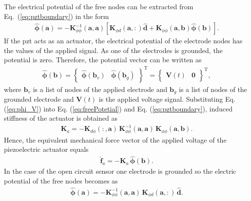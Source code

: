 \documentclass[11pt,a4paper,final]{report}
\theoremstyle{plain}
\begin{document}
The electrical potential of the free nodes can be extracted from Eq.~(\ref{eq:pztboundary}) in the form
\begin{eqnarray}
	\widehat{\boldsymbol{\phi}}(\textbf{a}) = -\textbf{K}_{\phi\phi}^{-1}(\textbf{a},\textbf{a})\left[\textbf{K}_{\phi d}(\textbf{a},:) \widehat{\textbf{d}} + \textbf{K}_{\phi\phi}(\textbf{a},\textbf{b})\widehat{\boldsymbol{\phi}}(\textbf{b}) \right].
	\label{eq:freePotetial}
\end{eqnarray}
If the \ac{pzt} acts as an actuator, the electrical potential of the electrode nodes has the values of the applied signal.
As one of the electrodes is grounded, the potential is zero.
Therefore, the potential vector can be written as
\begin{eqnarray}
	\widehat{\boldsymbol{\phi}}(\textbf{b}) = \left \{\begin{array}{cc}
		\widehat{\boldsymbol{\phi}}(\textbf{b}_v) &
		\widehat{\boldsymbol{\phi}}(\textbf{b}_g)
	\end{array}\right \}^{\mathrm{T}}=\left \{\begin{array}{cc}
	\textbf{V}(t) & \textbf{0}
	\end{array}\right \}^{\mathrm{T}},
	\label{eq:phi_V}
\end{eqnarray}
where \(\textbf{b}_v\) is a list of nodes of the applied electrode and \(\textbf{b}_g\) is a list of nodes of the grounded electrode and \(\textbf{V}(t)\) is the applied voltage signal.
Substituting Eq. (\ref{eq:phi_V}) into Eq. (\ref{eq:freePotetial}) and Eq. (\ref{eq:pztboundary}), induced stiffness of the actuator is obtained as
\begin{eqnarray}
	\textbf{K}_{a}=-\textbf{K}_{d\phi}(:,\textbf{a})\,\textbf{K}_{\phi \phi}^{-1}(\textbf{a},\textbf{a})\,\textbf{K}_{\phi \phi} (\textbf{a},\textbf{b}).
\end{eqnarray}
Hence, the equivalent mechanical force vector of the applied voltage of the piezoelectric actuator equals
\begin{eqnarray}
	\widehat{\textbf{f}}_{a}=-\textbf{K}_{a}\,\widehat{\boldsymbol{\phi}}(\textbf{b}).
	\label{eq:f_act}
\end{eqnarray}
In the case of the open circuit sensor one electrode is grounded so the electric potential of the free nodes becomes as
\begin{eqnarray}
	\widehat{\boldsymbol{\phi}}(\textbf{a}) = -\textbf{K}_{\phi\phi}^{-1}(\textbf{a},\textbf{a})\,\textbf{K}_{\phi d}(\textbf{a},:)\,\widehat{\textbf{d}}.
	\label{eq:sensorPotetial}
\end{eqnarray}
\end{document}
